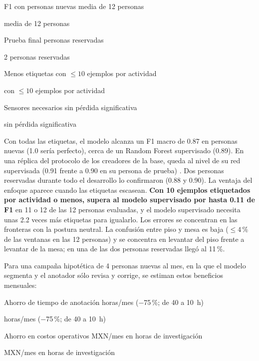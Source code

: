 \documentclass[letterpaper,11pt]{article}
\newcommand{\cifra}[5]{%
  \begingroup\setlength{\fboxsep}{5pt}%
  \colorbox{#1}{\parbox[t]{\dimexpr\linewidth-2\fboxsep\relax}{%
    \setstretch{1}\color{#2}{\Large\bfseries #3}\par
    #4%
    \ifx\relax#5\relax\else\par{\footnotesize #5}\fi}}%
  \endgroup}
\newcommand{\cifragris}[4]{\cifra{black!8}{black}{#1}{#2}{#3}}
\newcommand{\cifraacento}[4]{\cifra{blue!10}{blue!55!black}{#1}{#2}{#3}}
\begin{document}
\medskip
\noindent
\begin{minipage}[t]{0.235\linewidth}\cifragris{0.87}{F1 con personas nuevas}{media de 12 personas}{}\end{minipage}\hfill
\begin{minipage}[t]{0.235\linewidth}\cifragris{0.88 y 0.90}{Prueba final}{2 personas reservadas}{}\end{minipage}\hfill
\begin{minipage}[t]{0.235\linewidth}\cifraacento{2.2$\times$}{Menos etiquetas}{con $\le 10$ ejemplos por actividad}{}\end{minipage}\hfill
\begin{minipage}[t]{0.235\linewidth}\cifragris{11 de 17}{Sensores necesarios}{sin pérdida significativa}{}\end{minipage}
\medskip

Con todas las etiquetas, el modelo alcanza un F1 macro de 0.87 en personas nuevas (1.0 sería perfecto), cerca de un Random Forest supervisado (0.89). En una réplica del protocolo de los creadores de la base, queda al nivel de su red supervisada (0.91 frente a 0.90 en su persona de prueba) \parencite{bassani2025}. Dos personas reservadas durante todo el desarrollo lo confirmaron (0.88 y 0.90). La ventaja del enfoque aparece cuando las etiquetas escasean. \textbf{Con 10 ejemplos etiquetados por actividad o menos, supera al modelo supervisado por hasta 0.11 de F1} en 11 o 12 de las 12 personas evaluadas, y el modelo supervisado necesita unas 2.2 veces más etiquetas para igualarlo. Los errores se concentran en las fronteras con la postura neutral. La confusión entre piso y mesa es baja ($\le 4$\,\% de las ventanas en las 12 personas) y se concentra en levantar del piso frente a levantar de la mesa; en una de las dos personas reservadas llegó al 11\,\%.

Para una campaña hipotética de 4 personas nuevas al mes, en la que el modelo segmenta y el anotador sólo revisa y corrige, se estiman estos beneficios mensuales:

\medskip
\noindent
\begin{minipage}[t]{0.485\linewidth}\cifragris{$-$30\,h}{Ahorro de tiempo de anotación}{horas/mes ($-$75\,\%; de 40 a 10~h)}{}\end{minipage}\hfill
\begin{minipage}[t]{0.485\linewidth}\cifragris{$-$\$5\,100}{Ahorro en costos operativos}{MXN/mes en horas de investigación}{}\end{minipage}
\end{document}
